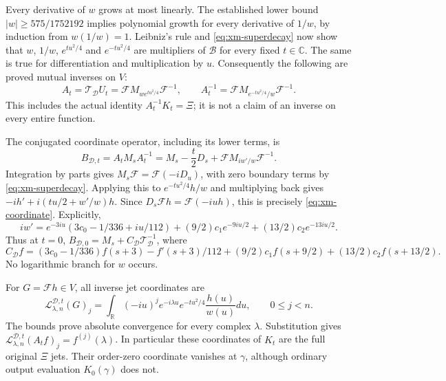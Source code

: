Every derivative of $w$ grows at most linearly. The established
lower bound $|w|\ge575/1752192$ implies polynomial growth for every
derivative of $1/w$, by induction from $w(1/w)=1$.
Leibniz's rule and \eqref{eq:xm-superdecay} now show that
$w$, $1/w$, $e^{tu^2/4}$ and $e^{-tu^2/4}$ are multipliers of
$\mathcal B$ for every fixed $t\in\mathbb C$.
The same is true for differentiation and multiplication by $u$.
Consequently the following are proved mutual inverses on $V$:
\begin{equation}\label{eq:xm-automorphism}
 A_t=\mathcal T_{\mathcal D}U_t
     =\mathscr F M_{we^{tu^2/4}}\mathscr F^{-1},\qquad
 A_t^{-1}=\mathscr F M_{e^{-tu^2/4}/w}\mathscr F^{-1}.
\end{equation}
This includes the actual identity $A_t^{-1}K_t=\Xi$; it is not
a claim of an inverse on every entire function.

The conjugated coordinate operator, including its lower terms, is
\begin{equation}\label{eq:xm-coordinate}
 B_{\mathcal D,t}=A_tM_sA_t^{-1}
 =M_s-\frac t2D_s+\mathscr F M_{iw'/w}\mathscr F^{-1}.
\end{equation}
Integration by parts gives $M_s\mathscr F=\mathscr F(-iD_u)$,
with zero boundary terms by \eqref{eq:xm-superdecay}.
Applying this to $e^{-tu^2/4}h/w$ and multiplying back gives
$-ih'+i(tu/2+w'/w)h$. Since
$D_s\mathscr Fh=\mathscr F(-iu h)$, this is precisely
\eqref{eq:xm-coordinate}. Explicitly,
\[
 iw'=e^{-3iu}(3c_0-1/336+iu/112)
       +(9/2)c_1e^{-9iu/2}+(13/2)c_2e^{-13iu/2}.
\]
Thus at $t=0$, $B_{\mathcal D,0}=M_s+C_{\mathcal D}
\mathcal T_{\mathcal D}^{-1}$, where
\[
 C_{\mathcal D}f=(3c_0-1/336)f(s+3)-f'(s+3)/112
       +(9/2)c_1f(s+9/2)+(13/2)c_2f(s+13/2).
\]
No logarithmic branch for $w$ occurs.

For $G=\mathscr Fh\in V$, all inverse jet coordinates are
\begin{equation}\label{eq:xm-jets}
 \mathcal L^{\mathcal D,t}_{\lambda,n}(G)_j
 =\int_{\mathbb R}(-iu)^j e^{-i\lambda u}
             e^{-tu^2/4}\frac{h(u)}{w(u)}du,
 \qquad 0\le j<n.
\end{equation}
The bounds prove absolute convergence for every complex $\lambda$.
Substitution gives
$\mathcal L^{\mathcal D,t}_{\lambda,n}(A_tf)_j=f^{(j)}(\lambda)$.
In particular these coordinates of $K_t$ are the full original
$\Xi$ jets. Their order-zero coordinate vanishes at $\gamma$,
although ordinary output evaluation $K_0(\gamma)$ does not.

